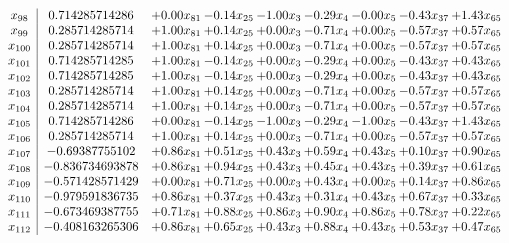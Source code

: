 \documentclass[8pt]{article}
\begin{document}
\[\begin{array}{c| c c@{\hskip 2pt} c@{\hskip 2pt} c@{\hskip 2pt} c@{\hskip 2pt} c@{\hskip 2pt} c@{\hskip 2pt} c@{\hskip 2pt} }
 x_{98}   &  0.714285714286 & +  0.00 x_{81} & -0.14 x_{25} & -1.00 x_{3} & -0.29 x_{4} & -0.00 x_{5} & -0.43 x_{37} & +  1.43 x_{65}\\
 x_{99}   &  0.285714285714 & +  1.00 x_{81} & +  0.14 x_{25} & +  0.00 x_{3} & -0.71 x_{4} & +  0.00 x_{5} & -0.57 x_{37} & +  0.57 x_{65}\\
 x_{100}   &  0.285714285714 & +  1.00 x_{81} & +  0.14 x_{25} & +  0.00 x_{3} & -0.71 x_{4} & +  0.00 x_{5} & -0.57 x_{37} & +  0.57 x_{65}\\
 x_{101}   &  0.714285714285 & +  1.00 x_{81} & -0.14 x_{25} & +  0.00 x_{3} & -0.29 x_{4} & +  0.00 x_{5} & -0.43 x_{37} & +  0.43 x_{65}\\
 x_{102}   &  0.714285714285 & +  1.00 x_{81} & -0.14 x_{25} & +  0.00 x_{3} & -0.29 x_{4} & +  0.00 x_{5} & -0.43 x_{37} & +  0.43 x_{65}\\
 x_{103}   &  0.285714285714 & +  1.00 x_{81} & +  0.14 x_{25} & +  0.00 x_{3} & -0.71 x_{4} & +  0.00 x_{5} & -0.57 x_{37} & +  0.57 x_{65}\\
 x_{104}   &  0.285714285714 & +  1.00 x_{81} & +  0.14 x_{25} & +  0.00 x_{3} & -0.71 x_{4} & +  0.00 x_{5} & -0.57 x_{37} & +  0.57 x_{65}\\
 x_{105}   &  0.714285714286 & +  0.00 x_{81} & -0.14 x_{25} & -1.00 x_{3} & -0.29 x_{4} & -1.00 x_{5} & -0.43 x_{37} & +  1.43 x_{65}\\
 x_{106}   &  0.285714285714 & +  1.00 x_{81} & +  0.14 x_{25} & +  0.00 x_{3} & -0.71 x_{4} & +  0.00 x_{5} & -0.57 x_{37} & +  0.57 x_{65}\\
 x_{107}   &  -0.69387755102 & +  0.86 x_{81} & +  0.51 x_{25} & +  0.43 x_{3} & +  0.59 x_{4} & +  0.43 x_{5} & +  0.10 x_{37} & +  0.90 x_{65}\\
 x_{108}   &  -0.836734693878 & +  0.86 x_{81} & +  0.94 x_{25} & +  0.43 x_{3} & +  0.45 x_{4} & +  0.43 x_{5} & +  0.39 x_{37} & +  0.61 x_{65}\\
 x_{109}   &  -0.571428571429 & +  0.00 x_{81} & +  0.71 x_{25} & +  0.00 x_{3} & +  0.43 x_{4} & +  0.00 x_{5} & +  0.14 x_{37} & +  0.86 x_{65}\\
 x_{110}   &  -0.979591836735 & +  0.86 x_{81} & +  0.37 x_{25} & +  0.43 x_{3} & +  0.31 x_{4} & +  0.43 x_{5} & +  0.67 x_{37} & +  0.33 x_{65}\\
 x_{111}   &  -0.673469387755 & +  0.71 x_{81} & +  0.88 x_{25} & +  0.86 x_{3} & +  0.90 x_{4} & +  0.86 x_{5} & +  0.78 x_{37} & +  0.22 x_{65}\\
 x_{112}   &  -0.408163265306 & +  0.86 x_{81} & +  0.65 x_{25} & +  0.43 x_{3} & +  0.88 x_{4} & +  0.43 x_{5} & +  0.53 x_{37} & +  0.47 x_{65}\\

\end{array}\]
\end{document}
